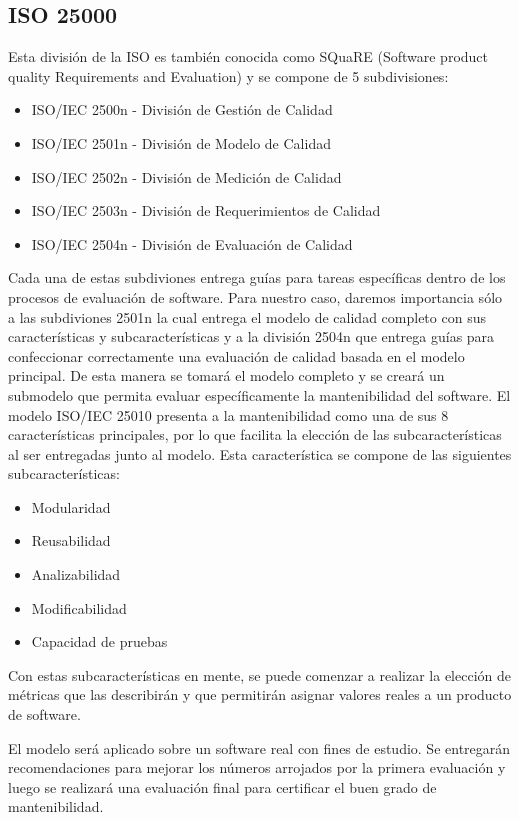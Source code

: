 \documentclass[letterpaper]{article}
\begin{document}
\subsection{ISO 25000}
Esta división de la ISO es también conocida como SQuaRE (Software product
quality Requirements and Evaluation) y se compone de 5 subdivisiones:
\begin{itemize}
    \item ISO/IEC 2500n - División de Gestión de Calidad
    \item ISO/IEC 2501n - División de Modelo de Calidad
    \item ISO/IEC 2502n - División de Medición de Calidad
    \item ISO/IEC 2503n - División de Requerimientos de Calidad
    \item ISO/IEC 2504n - División de Evaluación de Calidad
\end{itemize}

Cada una de estas subdiviones entrega guías para tareas específicas dentro
de los procesos de evaluación de software. 
Para nuestro caso, daremos importancia sólo a las subdiviones 2501n la cual
entrega el modelo de calidad completo con sus características y subcaracterísticas
y a la división 2504n que entrega guías para confeccionar correctamente una
evaluación de calidad basada en el modelo principal.
De esta manera se tomará el modelo completo y se creará un submodelo que permita
evaluar específicamente la mantenibilidad del software. 
El modelo ISO/IEC 25010 presenta a la mantenibilidad como una de sus 8 características
principales, por lo que facilita la elección de las subcaracterísticas al ser
entregadas junto al modelo. 
Esta característica se compone de las siguientes subcaracterísticas:

\begin{itemize}
	\item Modularidad
	\item Reusabilidad
	\item Analizabilidad
	\item Modificabilidad
	\item Capacidad de pruebas
\end{itemize}

Con estas subcaracterísticas en mente, se puede comenzar a realizar la elección
de métricas que las describirán y que permitirán asignar valores reales a un 
producto de software. 

El modelo será aplicado sobre un software real con fines de estudio. Se entregarán
recomendaciones para mejorar los números arrojados por la primera evaluación y 
luego se realizará una evaluación final para certificar el buen grado de mantenibilidad.
\end{document}
